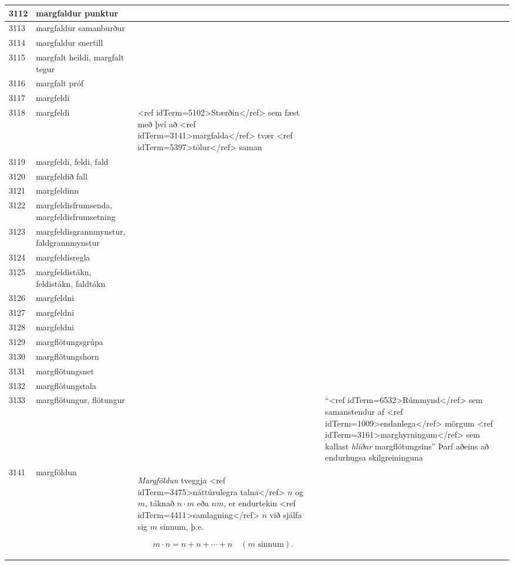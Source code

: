 \begin{longtable}{p{}|p{}|p{}|p{}|p{}}
\hline
3112 & margfaldur punktur &  &  &  \\
\hline
3113 & margfaldur samanburður &  &  &  \\
\hline
3114 & margfaldur snertill &  &  &  \\
\hline
3115 & margfalt heildi, margfalt tegur &  &  &  \\
\hline
3116 & margfalt próf &  &  &  \\
\hline
3117 & margfeldi &  &  &  \\
\hline
3118 & margfeldi & <ref idTerm=5102>Stærðin</ref> sem fæst með því að <ref idTerm=3141>margfalda</ref> tvær <ref idTerm=5397>tölur</ref> saman &  & \\
\hline
3119 & margfeldi, feldi, fald &  &  &  \\
\hline
3120 & margfeldið fall &  &  &  \\
\hline
3121 & margfeldinn &  &  &  \\
\hline
3122 & margfeldisfrumsenda, margfeldisfrumsetning &  &  &  \\
\hline
3123 & margfeldisgrannmynstur, faldgrannmynstur &  &  &  \\
\hline
3124 & margfeldisregla &  &  &  \\
\hline
3125 & margfeldistákn, feldistákn, faldtákn &  &  &  \\
\hline
3126 & margfeldni &  &  &  \\
\hline
3127 & margfeldni &  &  &  \\
\hline
3128 & margfeldni &  &  &  \\
\hline
3129 & margflötungsgrúpa &  &  &  \\
\hline
3130 & margflötungshorn &  &  &  \\
\hline
3131 & margflötungsnet &  &  &  \\
\hline
3132 & margflötungstala &  &  &  \\
\hline
3133 & margflötungur, flötungur &  & & ``<ref idTerm=6532>Rúmmynd</ref> sem samanstendur af <ref idTerm=1009>endanlega</ref> mörgum <ref idTerm=3161>marghyrningum</ref> sem kallast \textit{hliðar} margflötungsins'' Þarf aðeins að endurhugsa skilgreininguna \\
\hline
3141 & margföldun & \textit{Margföldun} tveggja <ref idTerm=3475>náttúrulegra talna</ref> $n$ og $m$, táknað $n\cdot m$ eða $nm$, er endurtekin <ref idTerm=4411>samlagning</ref> $n$ við sjálfa sig $m$ sinnum, þ.e.

\[ m \cdot n = n + n + \cdots + n \quad (\text{$m$ sinnum}). \] 


\end{longtable}
